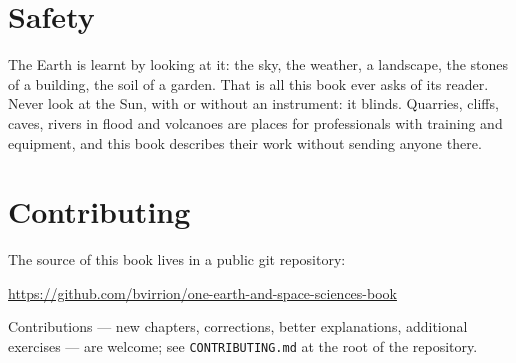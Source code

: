 \section*{Safety}

The Earth is learnt by looking at it: the sky, the weather, a landscape, the
stones of a building, the soil of a garden. That is all this book ever asks
of its reader. Never look at the Sun, with or without an instrument: it
blinds. Quarries, cliffs, caves, rivers in flood and volcanoes are places
for professionals with training and equipment, and this book describes their
work without sending anyone there.

\section*{Contributing}

The source of this book lives in a public git repository:
\begin{center}
\url{https://github.com/bvirrion/one-earth-and-space-sciences-book}
\end{center}
Contributions --- new chapters, corrections, better explanations,
additional exercises --- are welcome; see \texttt{CONTRIBUTING.md} at the
root of the repository.
